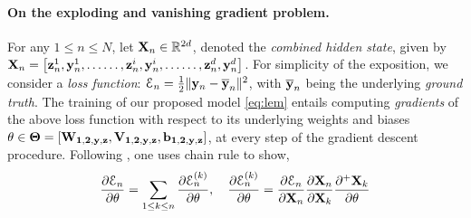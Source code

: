 \documentclass{article} \usepackage{iclr2022_conference,times}
\newcommand{\by}{{\bf y}}
\newcommand{\bz}{{\bf z}}
\newcommand{\bW}{{\bf W}}
\newcommand{\bb}{{\bf b}}
\newcommand{\bV}{{\bf V}}
\newcommand{\bX}{{\bf X}}
\newcommand{\R}{{\mathbb R}}
\newcommand{\E}{\EuScript{E}}
\begin{document}
\paragraph{On the exploding and vanishing gradient problem.} 
For any $1 \leq n \leq N$, let $\bX_n \in \R^{2d}$, denoted the \emph{combined hidden state}, given by $\bX_n = \left[\bz_n^1,\by_n^1,\ldots \ldots,\bz_n^i,\by_n^i,\ldots \ldots,\bz_n^d,\by_n^d\right]$. 
For simplicity of the exposition, we 
consider a \emph{loss function}: $\E_n = \frac{1}{2}\|\by_n - \overline{\by}_n\|^2$, with $
\overline{\by}_n$ being the underlying \emph{ground truth}. The training of our proposed model \eqref{eq:lem} entails computing \emph{gradients} of the above loss function with respect to its underlying weights and biases $\theta \in \bf \Theta = [\bW_{1,2,y,z},\bV_{1,2,y,z},\bb_{1,2,y,z}]$,
at every step of the gradient descent procedure. Following \cite{vanish_grad}, one uses chain rule to show,
\begin{equation}
    \label{eq:chain}
    \frac{\partial \E_n}{\partial \theta} = \sum\limits_{1\leq k \leq n} \frac{\partial \E^{(k)}_n}{\partial \theta}, \quad \frac{\partial \E^{(k)}_n}{\partial \theta} = \frac{\partial \E_n}{\partial \bX_n} \frac{\partial \bX_n}{\partial \bX_k} \frac{\partial^{+} \bX_k}{\partial \theta}
\end{equation}
\end{document}
